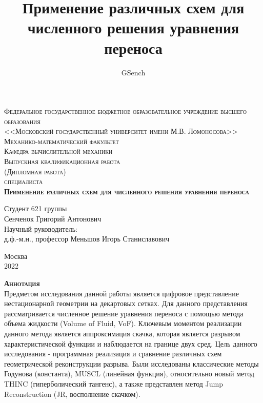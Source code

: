 \documentclass[12pt,a4paper]{article}
\author{GSench}
\title{Применение различных схем для численного решения уравнения переноса}
\begin{document}
\begin{titlepage}

\begin{center}
\textsc{Федеральное государственное бюджетное образовательное учреждение высшего образования\\
<<Московский государственный университет имени М.В. Ломоносова>>}\\
\vspace{12pt}
\textsc{Механико-математический факультет}\\
\textsc{Кафедра вычислительной механики}\\

\vspace*{\fill}
\textsc{Выпускная квалификационная работа\\
(Дипломная работа)\\
специалиста}\\
\vspace{12pt}
\textsc{\textbf{Применение различных схем для численного решения уравнения переноса}}\\
\vspace*{\fill}

\end{center}

\begin{flushright}
Студент 621 группы \\
Сенченок Григорий Антонович\\
\vspace{10pt}
Научный руководитель: \\
д.ф.-м.н., профессор Меньшов Игорь Станиславович
\end{flushright}

\mbox{}
\vfill
\begin{center}
Москва\\[5pt]
2022
\end{center}

\end{titlepage}

\newpage
\textsc{\textbf{Аннотация}}\\
Предметом исследования данной работы является цифровое представление нестационарной геометрии на декартовых сетках.
Для данного представления рассматривается численное решение уравнения переноса с помощью метода объема жидкости (Volume of Fluid, VoF). Ключевым моментом реализации данного метода является аппроксимация скачка, которая является разрывом характеристической функции и наблюдается на границе двух сред.
Цель данного исследования - программная реализация и сравнение различных схем геометрической реконструкции разрыва. Были исследованы классические методы Годунова (константа), MUSCL (линейная функция), относительно новый метод THINC (гиперболический тангенс), а также представлен метод Jump Reconstruction (JR, восполнение скачком).
\end{document}
